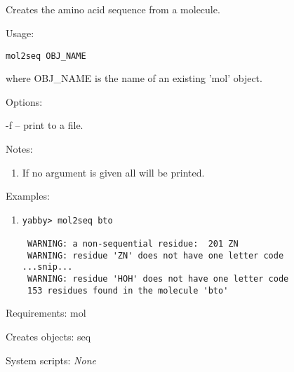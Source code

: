 

\subsection[mol2seq]{  }



Creates the amino acid sequence from a molecule.


\begin{description}


\item{Usage:}

{\tt mol2seq OBJ\_NAME}

where OBJ\_NAME is the name of an existing 'mol' object.


\item{Options:}
\begin{description}
\item -f -- print to a file.
\end{description}


\item{Notes:}
\begin{enumerate}
\item If no argument is given all will be printed.
\end{enumerate}


\item{Examples:}
\begin{enumerate}

\item
\begin{verbatim}
yabby> mol2seq bto

 WARNING: a non-sequential residue:  201 ZN
 WARNING: residue 'ZN' does not have one letter code
...snip...
 WARNING: residue 'HOH' does not have one letter code
 153 residues found in the molecule 'bto'
\end{verbatim}

\end{enumerate}


\item{Requirements:} mol


\item{Creates objects:} seq


\item{System scripts:} {\em None}

\end{description}

